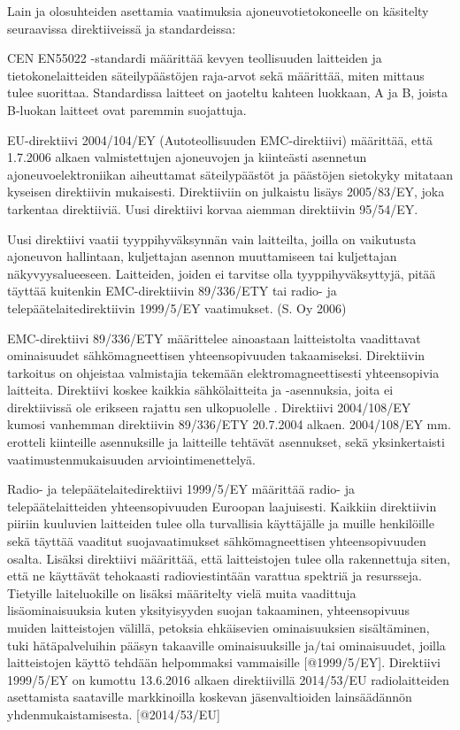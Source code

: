 Lain ja olosuhteiden asettamia vaatimuksia ajoneuvotietokoneelle on käsitelty seuraavissa direktiiveissä ja standardeissa:

CEN EN55022 -standardi määrittää kevyen teollisuuden laitteiden ja tietokonelaitteiden säteilypäästöjen raja-arvot sekä määrittää, miten mittaus tulee suorittaa. Standardissa laitteet on jaoteltu kahteen luokkaan, A ja B, joista B-luokan laitteet ovat paremmin suojattuja.\cite{EN55022}

EU-direktiivi 2004/104/EY (Autoteollisuuden EMC-direktiivi) määrittää, että
1.7.2006 alkaen valmistettujen ajoneuvojen ja kiinteästi asennetun
ajoneuvoelektroniikan aiheuttamat säteilypäästöt ja päästöjen sietokyky
mitataan kyseisen direktiivin mukaisesti. Direktiiviin on julkaistu
lisäys 2005/83/EY, joka tarkentaa direktiiviä. Uusi direktiivi korvaa
aiemman direktiivin 95/54/EY.

Uusi direktiivi vaatii tyyppihyväksynnän vain laitteilta, joilla on
vaikutusta ajoneuvon hallintaan, kuljettajan asennon muuttamiseen tai
kuljettajan näkyvyysalueeseen. Laitteiden, joiden ei tarvitse olla
tyyppihyväksyttyjä, pitää täyttää kuitenkin EMC-direktiivin 89/336/ETY
tai radio- ja telepäätelaitedirektiivin 1999/5/EY vaatimukset. (S. Oy
2006) \cite{1999/5/EY} \cite{89/336/ETY}

EMC-direktiivi 89/336/ETY määrittelee ainoastaan laitteistolta
vaadittavat ominaisuudet sähkömagneettisen yhteensopivuuden
takaamiseksi. Direktiivin tarkoitus on ohjeistaa valmistajia tekemään
elektromagneettisesti yhteensopivia laitteita. Direktiivi koskee kaikkia
sähkölaitteita ja -asennuksia, joita ei direktiivissä ole erikseen
rajattu sen ulkopuolelle \cite{89/336/ETY}. Direktiivi 2004/108/EY
kumosi vanhemman direktiivin 89/336/ETY 20.7.2004 alkaen. 2004/108/EY
mm. erotteli kiinteille asennuksille ja laitteille tehtävät asennukset,
sekä yksinkertaisti vaatimustenmukaisuuden arviointimenettelyä.
\cite{2004/108/EY}

Radio- ja telepäätelaitedirektiivi 1999/5/EY määrittää radio- ja
telepäätelaitteiden yhteensopivuuden Euroopan laajuisesti. Kaikkiin
direktiivin piiriin kuuluvien laitteiden tulee olla turvallisia
käyttäjälle ja muille henkilöille sekä täyttää vaaditut
suojavaatimukset sähkömagneettisen yhteensopivuuden osalta. Lisäksi
direktiivi määrittää, että laitteistojen tulee olla rakennettuja siten,
että ne käyttävät tehokaasti radioviestintään varattua spektriä ja
resursseja. Tietyille laiteluokille on lisäksi määritelty vielä muita
vaadittuja lisäominaisuuksia kuten yksityisyyden suojan takaaminen,
yhteensopivuus muiden laitteistojen välillä, petoksia
ehkäisevien ominaisuuksien sisältäminen, tuki hätäpalveluihin pääsyn takaaville
ominaisuuksille ja/tai ominaisuudet, joilla laitteistojen
käyttö tehdään helpommaksi vammaisille {[}@1999/5/EY{]}. Direktiivi
1999/5/EY on kumottu 13.6.2016 alkaen direktiivillä 2014/53/EU
radiolaitteiden asettamista saataville markkinoilla koskevan
jäsenvaltioiden lainsäädännön yhdenmukaistamisesta. {[}@2014/53/EU{]}

